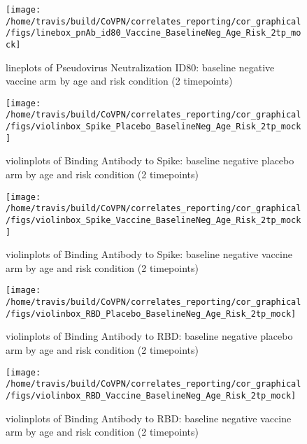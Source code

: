 \documentclass[]{book}
\theoremstyle{definition}
\theoremstyle{definition}
\theoremstyle{definition}
\newcommand{\1}{\mathbbm{1}}
\begin{document}
\clearpage
\begin{figure}[H]

{\centering \texttt{[image: /home/travis/build/CoVPN/correlates\_reporting/cor\_graphical/figs/linebox\_pnAb\_id80\_Vaccine\_BaselineNeg\_Age\_Risk\_2tp\_mock]} 

}

\caption{lineplots of Pseudovirus Neutralization ID80: baseline negative vaccine arm by age and risk condition (2 timepoints)}\label{fig:unnamed-chunk-130}
\end{figure}

\clearpage
\begin{figure}[H]

{\centering \texttt{[image: /home/travis/build/CoVPN/correlates\_reporting/cor\_graphical/figs/violinbox\_Spike\_Placebo\_BaselineNeg\_Age\_Risk\_2tp\_mock]} 

}

\caption{violinplots of Binding Antibody to Spike: baseline negative placebo arm by age and risk condition (2 timepoints)}\label{fig:unnamed-chunk-131}
\end{figure}

\clearpage
\begin{figure}[H]

{\centering \texttt{[image: /home/travis/build/CoVPN/correlates\_reporting/cor\_graphical/figs/violinbox\_Spike\_Vaccine\_BaselineNeg\_Age\_Risk\_2tp\_mock]} 

}

\caption{violinplots of Binding Antibody to Spike: baseline negative vaccine arm by age and risk condition (2 timepoints)}\label{fig:unnamed-chunk-132}
\end{figure}

\clearpage
\begin{figure}[H]

{\centering \texttt{[image: /home/travis/build/CoVPN/correlates\_reporting/cor\_graphical/figs/violinbox\_RBD\_Placebo\_BaselineNeg\_Age\_Risk\_2tp\_mock]} 

}

\caption{violinplots of Binding Antibody to RBD: baseline negative placebo arm by age and risk condition (2 timepoints)}\label{fig:unnamed-chunk-133}
\end{figure}

\clearpage
\begin{figure}[H]

{\centering \texttt{[image: /home/travis/build/CoVPN/correlates\_reporting/cor\_graphical/figs/violinbox\_RBD\_Vaccine\_BaselineNeg\_Age\_Risk\_2tp\_mock]} 

}

\caption{violinplots of Binding Antibody to RBD: baseline negative vaccine arm by age and risk condition (2 timepoints)}\label{fig:unnamed-chunk-134}
\end{figure}
\end{document}
